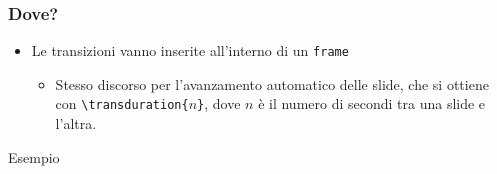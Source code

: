 \begin{frame}
 \frametitle{Dove?}
 
 \begin{itemize}
  \item Le transizioni vanno inserite all'interno di un \texttt{frame}
  \begin{itemize}
   \item Stesso discorso per l'avanzamento automatico delle slide, che si 
ottiene con \texttt{\textbackslash transduration\{$n$\}}, dove $n$ è il numero 
di secondi tra una slide e l'altra.
  \end{itemize}
 \end{itemize}
 
 \begin{exampleblock}{Esempio}
    
  \end{exampleblock}


\end{frame}

